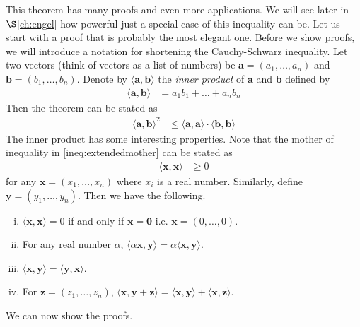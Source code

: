 \documentclass{subfile}
\begin{document}
	This theorem has many proofs and even more applications. We will see later in \hyperref[ch:engel]{$\S$\ref{ch:engel}} how powerful just a special case of this inequality can be. Let us start with a proof that is probably the most elegant one. Before we show proofs, we will introduce a notation for shortening the Cauchy-Schwarz inequality. Let two vectors (think of vectors as a list of numbers) be $\mathbf{a}=(a_1,\ldots,a_n)$ and $\mathbf{b}=(b_1,\ldots,b_n)$. Denote by $\langle \mathbf{a},\mathbf{b}\rangle$ the \textit{inner product} of $\mathbf{a}$ and $\mathbf{b}$ defined by
		\begin{align*}
			\langle \mathbf{a},\mathbf{b}\rangle
				& = a_1b_1+\ldots+a_nb_n
		\end{align*}
	Then the theorem can be stated as
		\begin{align*}
			\langle \mathbf{a},\mathbf{b}\rangle^2
				& \leq\langle\mathbf{a},\mathbf{a}\rangle\cdot\langle\mathbf{b},\mathbf{b}\rangle
		\end{align*}
	The inner product has some interesting properties. Note that the mother of inequality in \ref{ineq:extendedmother} can be  stated as
		\begin{align*}
			\langle\mathbf{x},\mathbf{x}\rangle
				& \geq0
		\end{align*}
	for any $\mathbf{x}=(x_1,\ldots,x_n)$ where $x_i$ is a real number. Similarly, define $\mathbf{y}=(y_1,\ldots,y_n)$. Then we have the following.
		\begin{enumerate}[(i)]\label{list:innerprops}
			\item $\langle\mathbf{x},\mathbf{x}\rangle=0$ if and only if $\mathbf{x}=\mathbf{0}$ i.e. $\mathbf{x}=(0,\ldots,0)$.
			\item For any real number $\alpha$, $\langle\alpha\mathbf{x},\mathbf{y}\rangle=\alpha\langle\mathbf{x},\mathbf{y}\rangle$.
			\item $\langle\mathbf{x},\mathbf{y}\rangle=\langle\mathbf{y},\mathbf{x}\rangle$.
			\item For $\mathbf{z}=(z_1,\ldots,z_n)$, $\langle\mathbf{x},\mathbf{y}+\mathbf{z}\rangle=\langle\mathbf{x},\mathbf{y}\rangle+\langle\mathbf{x},\mathbf{z}\rangle$.
		\end{enumerate}
	We can now show the proofs.
\end{document}
